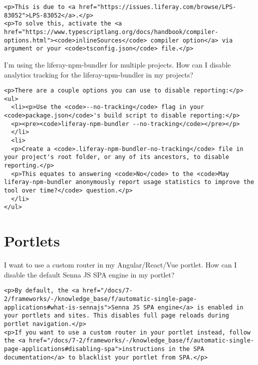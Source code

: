 \begin{verbatim}
<p>This is due to <a href="https://issues.liferay.com/browse/LPS-83052">LPS-83052</a>.</p>
<p>To solve this, activate the <a href="https://www.typescriptlang.org/docs/handbook/compiler-options.html"><code>inlineSources</code> compiler option</a> via argument or your <code>tsconfig.json</code> file.</p>
\end{verbatim}

\label{disable-bundler-analytics}
{I'm using the liferay-npm-bundler for multiple projects. How can I
disable analytics tracking for the liferay-npm-bundler in my
projects?~{}}

\begin{verbatim}
<p>There are a couple options you can use to disable reporting:</p>
<ul>
  <li><p>Use the <code>--no-tracking</code> flag in your <code>package.json</code>'s build script to disable reporting:</p>
  <p><pre><code>liferay-npm-bundler --no-tracking</code></pre></p>
  </li>
  <li>
  <p>Create a <code>.liferay-npm-bundler-no-tracking</code> file in your project's root folder, or any of its ancestors, to disable reporting.</p>
  <p>This equates to answering <code>No</code> to the <code>May liferay-npm-bundler anonymously report usage statistics to improve the tool over time?</code> question.</p>
  </li>
</ul>
\end{verbatim}

\section{Portlets}\label{portlets}

\label{angular-react-vue-portlet-disable-spa}
{I want to use a custom router in my Angular/React/Vue portlet. How can
I disable the default Senna JS SPA engine in my portlet?~{}}

\begin{verbatim}
<p>By default, the <a href="/docs/7-2/frameworks/-/knowledge_base/f/automatic-single-page-applications#what-is-sennajs">Senna JS SPA engine</a> is enabled in your portlets and sites. This disables full page reloads during portlet navigation.</p>
<p>If you want to use a custom router in your portlet instead, follow the <a href="/docs/7-2/frameworks/-/knowledge_base/f/automatic-single-page-applications#disabling-spa">instructions in the SPA documentation</a> to blacklist your portlet from SPA.</p>
\end{verbatim}
